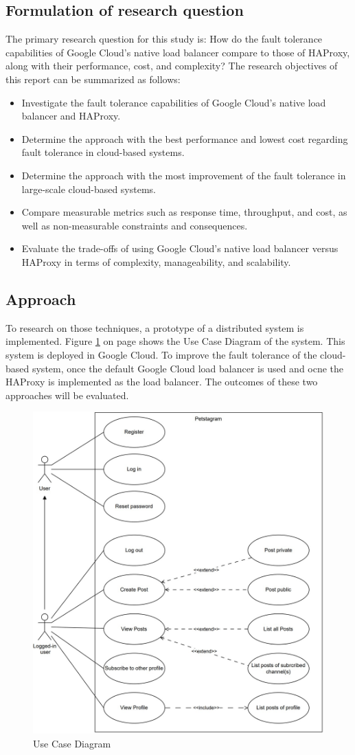 \documentclass[lettersize,journal]{IEEEtran}
\begin{document}
\subsection{Formulation of research question}
\noindent The primary research question for this study is: How do the fault tolerance capabilities of Google Cloud's native load balancer compare to those of HAProxy, along with their performance, cost, and complexity? The research objectives of this report can be summarized as follows:
\begin{itemize}{}{}
\item{Investigate the fault tolerance capabilities of Google Cloud's native load balancer and HAProxy.}
\item{Determine the approach with the best performance and lowest cost regarding fault tolerance in cloud-based systems.}
\item{Determine the approach with the most improvement of the fault tolerance in large-scale cloud-based systems.}
\item{Compare measurable metrics such as response time, throughput, and cost, as well as non-measurable constraints and consequences.}
\item{Evaluate the trade-offs of using Google Cloud's native load balancer versus HAProxy in terms of complexity, manageability, and scalability.}
\end{itemize}

\subsection{Approach}
\noindent To research on those techniques, a prototype of a distributed system is implemented. Figure \ref{fig:fig_use-case-diagram} on page \pageref{fig:fig_use-case-diagram} shows the Use Case Diagram of the system. This system is deployed in Google Cloud. To improve the fault tolerance of the cloud-based system, once the default Google Cloud load balancer is used and ocne the HAProxy is implemented as the load balancer. The outcomes of these two approaches will be evaluated.

\begin{figure}[!t]
    \centering
    \includegraphics[width=3.5 in]{use-case-diagram}
    \caption{Use Case Diagram}
    \label{fig:fig_use-case-diagram}
\end{figure}
\end{document}

